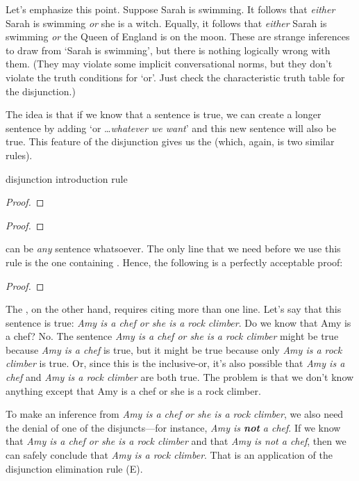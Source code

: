 Let's emphasize this point. Suppose Sarah is swimming. It follows that \emph{either} Sarah is swimming \emph{or} she is a witch. Equally, it follows that \emph{either} Sarah is swimming \emph{or} the Queen of England is on the moon. These are strange inferences to draw from `Sarah is swimming', but there is nothing logically wrong with them. (They may violate some implicit conversational norms, but they don't violate the truth conditions for `or'. Just check the characteristic truth table for the disjunction.)

The idea is that if we know that a sentence is true, we can create a longer sentence by adding `or \ldots \textit{whatever we want}' and this new sentence will also be true. This feature of the disjunction gives us the  (which, again, is two similar rules).

\begin{factboxy}{disjunction introduction rule}
\begin{proof}
\end{proof}

\begin{proof}
\end{proof}
\end{factboxy}


\noindent {} can be \emph{any} sentence whatsoever. The only line that we need before we use this rule is the one containing . Hence, the following is a perfectly acceptable proof:
\begin{proof}
	 \pr{}
\end{proof}

The , on the other hand, requires citing more than one line. Let's say that this sentence is true: \textit{Amy is a chef or she is a rock climber}. Do we know that Amy is a chef? No. The sentence \textit{Amy is a chef or she is a rock climber} might be true because \textit{Amy is a chef} is true, but it might be true because only \textit{Amy is a rock climber} is true. Or, since this is the inclusive-or, it's also possible that \textit{Amy is a chef} and \textit{Amy is a rock climber} are both true. The problem is that we don't know anything except that Amy is a chef or she is a rock climber. 

To make an inference from \textit{Amy is a chef or she is a rock climber}, we also need the denial of one of the disjuncts---for instance, \textit{Amy is \textbf{not} a chef}. If we know that \textit{Amy is a chef or she is a rock climber} and that \textit{Amy is not a chef}, then we can safely conclude that \textit{Amy is a rock climber}. That is an application of the disjunction elimination rule ({\eor}E).


